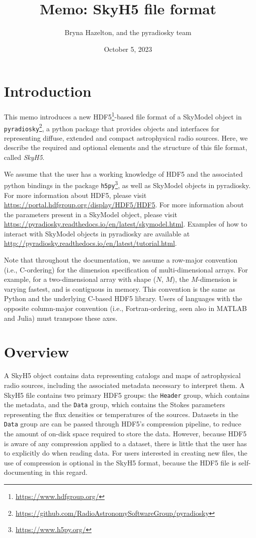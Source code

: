 \documentclass[11pt, oneside]{article}
\title{Memo: SkyH5 file format}
\author{Bryna Hazelton, and the pyradiosky team}
\date{October 5, 2023}
\begin{document}
\maketitle
\tableofcontents
\section{Introduction}
\label{sec:intro}

This memo introduces a new HDF5\footnote{\url{https://www.hdfgroup.org/}}-based
file format of a SkyModel object in \verb+pyradiosky+\footnote{\url{https://github.com/RadioAstronomySoftwareGroup/pyradiosky}},
a python package that provides objects and interfaces for representing diffuse, extended and compact astrophysical radio sources.
Here, we describe the required and optional elements and the structure of this file format, called \textit{SkyH5}.

We assume that the user has a working knowledge of HDF5 and the associated
python bindings in the package \verb+h5py+\footnote{\url{https://www.h5py.org/}}, as
well as SkyModel objects in pyradiosky. For more information about HDF5, please
visit \url{https://portal.hdfgroup.org/display/HDF5/HDF5}. For more information
about the parameters present in a SkyModel object, please visit
\url{https://pyradiosky.readthedocs.io/en/latest/skymodel.html}.
Examples of how to interact with SkyModel objects in pyradiosky are available at
\url{http://pyradiosky.readthedocs.io/en/latest/tutorial.html}.

Note that throughout the documentation, we assume a row-major convention (i.e.,
C-ordering) for the dimension specification of multi-dimensional arrays. For
example, for a two-dimensional array with shape ($N$, $M$), the $M$-dimension is
varying fastest, and is contiguous in memory. This convention is the same as
Python and the underlying C-based HDF5 library. Users of languages with the
opposite column-major convention (i.e., Fortran-ordering, seen also in MATLAB
and Julia) must transpose these axes.

\section{Overview}
\label{sec:overview}
A SkyH5 object contains data representing catalogs and maps of
astrophysical radio sources, including the associated metadata necessary to interpret them.
A SkyH5 file contains two primary HDF5 groups: the \verb+Header+ group, which contains the metadata, and
the \verb+Data+ group, which contains the Stokes parameters representing the
flux densities or temperatures of the sources. Datasets in the \verb+Data+ group
are can be passed through HDF5's compression
pipeline, to reduce the amount of on-disk space required to store the data.
However, because HDF5 is aware of any compression applied to a dataset, there is
little that the user has to explicitly do when reading data. For users
interested in creating new files, the use of compression is optional in the
SkyH5 format, because the HDF5 file is self-documenting in this regard.
\end{document}

